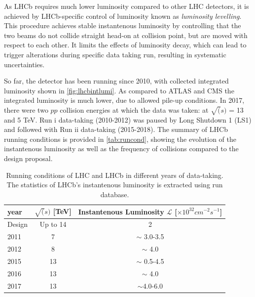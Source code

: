As \Gls{LHCb} requires much lower luminosity compared to other LHC detectors, it is achieved by LHCb-specific control of luminosity known as \textit{luminosity levelling}. This procedure achieves stable instantenous luminosity by controlling that the two beams do not collide straight head-on at collision point, but are moved with respect to each other. It limits the effects of luminosity decay, which can lead to trigger alterations during specific data taking run, resulting in systematic uncertainties.


So far, the detector has been running since 2010, with collected integrated luminosity shown in \autoref{fig:lhcbintlumi}. As compared to \Gls{ATLAS} and \Gls{CMS} the integrated luminosity is much lower, due to allowed pile-up conditions. In 2017, there were two $pp$ collision energies at which the data was taken: at $\sqrt(s)$  = 13 and 5 TeV. Run \Rn{1} data-taking (2010-2012) was paused by Long Shutdown 1 (\Gls{LS1}) and followed with Run \Rn{2} data-taking (2015-2018). The summary of LHCb running conditions is provided in \autoref{tab:runcond}, showing the evolution of the instantenous luminosity as well as the frequency of collisions compared to the design proposal.




\begin{table}[!h]
	\centering
	\hspace*{-0.8cm}
	\begin{tabular}{l c c }
		\hline
		year & $\sqrt(s)$ [TeV] & Instantenous Luminosity $\mathcal{L}$ [$\times10^{32} cm^{-2}	s^{-1}$] \\ \hline
		Design & Up to 14 & 2\\
		2011 & 7 & $\sim$ 3.0-3.5 \\
		2012 & 8 & $\sim$ 4.0 \\
		2015 & 13 & $\sim$ 0.5-4.5 \\      
		2016 & 13 & $\sim$ 4.0  \\      
		2017 & 13 & $\sim$4.0-6.0 \\\hline      
	\end{tabular}
	\caption{Running conditions of LHC and \Gls{LHCb} in different years of data-taking. The statistics of LHCb's instantenous luminosity is extracted using run database. }
	\label{tab:runcond}
\end{table}   

